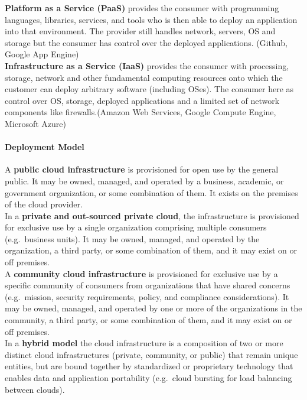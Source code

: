 \textbf{Platform as a Service (PaaS)} provides the consumer with programming languages,
libraries, services, and tools who is then able to deploy an application into that environment.
The provider still handles network, servers, OS and storage but the consumer has control over the deployed applications. (Github, Google App Engine)\\

\textbf{Infrastructure as a Service (IaaS)} provides the consumer with processing, storage, network and other fundamental computing resources onto which the customer can deploy arbitrary software (including OSes).
The consumer here as control over OS, storage, deployed applications and a limited set of network components like firewalls.(Amazon Web Services, Google Compute Engine, Microsoft Azure)

\paragraph{Deployment Model}
A \textbf{public cloud infrastructure} is provisioned for open use by the general public.
It may be owned, managed, and operated by a business, academic, or government organization, or some combination of them.
It exists on the premises of the cloud provider.\\

In a \textbf{private and out-sourced private cloud}, the infrastructure is provisioned for exclusive use by a single organization comprising multiple consumers (e.g.\ business units).
It may be owned, managed, and operated by the organization, a third party, or some combination of them, and it may exist on or off premises.\\

A \textbf{community cloud infrastructure} is provisioned for exclusive use by a specific community of consumers from organizations that have shared concerns (e.g.\ mission, security requirements, policy, and compliance considerations).
It may be owned, managed, and operated by one or more of the organizations in the community, a third party, or some combination of them, and it may exist on or off premises.\\

In a \textbf{hybrid model} the cloud infrastructure is a composition of two or more distinct cloud infrastructures (private, community, or public) that remain unique entities, but are bound together by standardized or proprietary technology that enables data and application portability (e.g.\ cloud bursting for load balancing between clouds).

